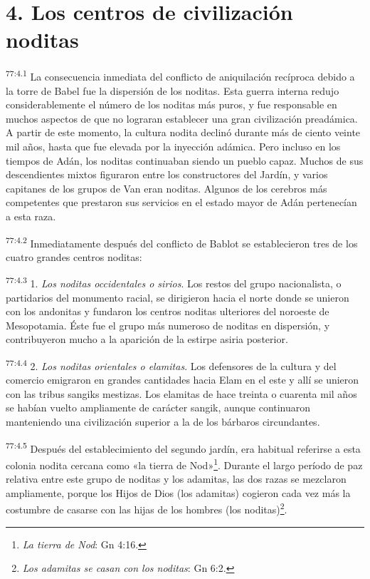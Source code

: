 \section*{4. Los centros de civilización noditas}
\par
\textsuperscript{77:4.1} La consecuencia inmediata del conflicto de aniquilación recíproca debido a la torre de Babel fue la dispersión de los noditas. Esta guerra interna redujo considerablemente el número de los noditas más puros, y fue responsable en muchos aspectos de que no lograran establecer una gran civilización preadámica. A partir de este momento, la cultura nodita declinó durante más de ciento veinte mil años, hasta que fue elevada por la inyección adámica. Pero incluso en los tiempos de Adán, los noditas continuaban siendo un pueblo capaz. Muchos de sus descendientes mixtos figuraron entre los constructores del Jardín, y varios capitanes de los grupos de Van eran noditas. Algunos de los cerebros más competentes que prestaron sus servicios en el estado mayor de Adán pertenecían a esta raza.

\par
\textsuperscript{77:4.2} Inmediatamente después del conflicto de Bablot se establecieron tres de los cuatro grandes centros noditas:

\par
\textsuperscript{77:4.3} 1. \textit{Los noditas occidentales o sirios}. Los restos del grupo nacionalista, o partidarios del monumento racial, se dirigieron hacia el norte donde se unieron con los andonitas y fundaron los centros noditas ulteriores del noroeste de Mesopotamia. Éste fue el grupo más numeroso de noditas en dispersión, y contribuyeron mucho a la aparición de la estirpe asiria posterior.

\par
\textsuperscript{77:4.4} 2. \textit{Los noditas orientales o elamitas}. Los defensores de la cultura y del comercio emigraron en grandes cantidades hacia Elam en el este y allí se unieron con las tribus sangiks mestizas. Los elamitas de hace treinta o cuarenta mil años se habían vuelto ampliamente de carácter sangik, aunque continuaron manteniendo una civilización superior a la de los bárbaros circundantes.

\par
\textsuperscript{77:4.5} Después del establecimiento del segundo jardín, era habitual referirse a esta colonia nodita cercana como «la tierra de Nod»\footnote{\textit{La tierra de Nod}: Gn 4:16.}. Durante el largo período de paz relativa entre este grupo de noditas y los adamitas, las dos razas se mezclaron ampliamente, porque los Hijos de Dios (los adamitas) cogieron cada vez más la costumbre de casarse con las hijas de los hombres (los noditas)\footnote{\textit{Los adamitas se casan con los noditas}: Gn 6:2.}.

